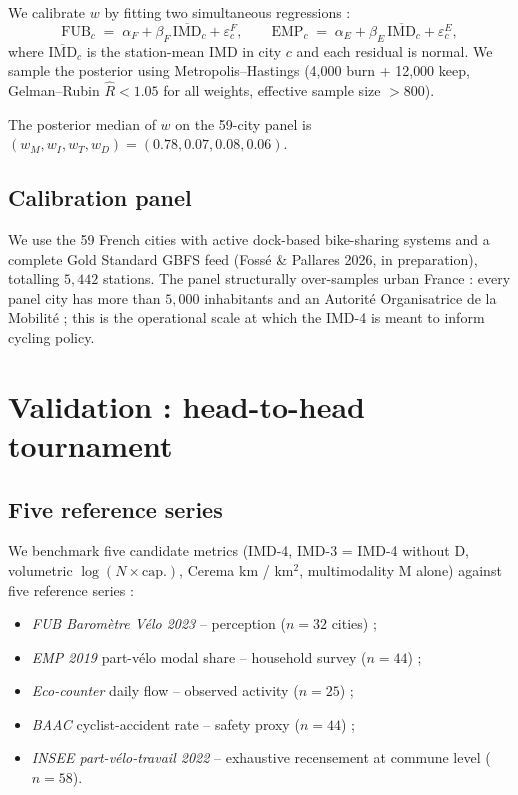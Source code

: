 \documentclass[11pt,a4paper]{article}
\newcommand{\IMD}{\mathrm{IMD}}
\begin{document}
We calibrate $w$ by fitting two simultaneous regressions :
\[
    \mathrm{FUB}_c \;=\; \alpha_F + \beta_F\, \overline{\IMD}_c + \varepsilon^{F}_{c}, \qquad
    \mathrm{EMP}_c \;=\; \alpha_E + \beta_E\, \overline{\IMD}_c + \varepsilon^{E}_{c},
\]
where $\overline{\IMD}_c$ is the station-mean IMD in city $c$ and
each residual is normal.  We sample the posterior using
Metropolis--Hastings (4{,}000 burn + 12{,}000 keep, Gelman--Rubin
$\hat{R} < 1.05$ for all weights, effective sample size $> 800$).

The posterior median of $w$ on the 59-city panel is
$(w_M, w_I, w_T, w_D) = (0.78, 0.07, 0.08, 0.06)$.

\subsection{Calibration panel}
\label{sec:calibration}

We use the 59 French cities with active dock-based bike-sharing
systems and a complete Gold Standard GBFS feed (Foss\'e
\& Pallares 2026, in preparation), totalling $5{,}442$ stations.
The panel structurally over-samples urban France : every panel city
has more than $5{,}000$ inhabitants and an Autorit\'e Organisatrice
de la Mobilit\'e ; this is the operational scale at which the IMD-4
is meant to inform cycling policy.

\section{Validation : head-to-head tournament}
\label{sec:tournament}

\subsection{Five reference series}

We benchmark five candidate metrics
(IMD-4, IMD-3 = IMD-4 without D, volumetric $\log(N \times \text{cap.})$,
Cerema km / km$^2$, multimodality M alone)
against five reference series :

\begin{itemize}[label=$\bullet$,leftmargin=*]
    \item \emph{FUB Barom\`etre V\'elo 2023} -- perception ($n=32$
          cities) ;
    \item \emph{EMP 2019} part-v\'elo modal share -- household
          survey ($n=44$) ;
    \item \emph{Eco-counter} daily flow -- observed activity ($n=25$) ;
    \item \emph{BAAC} cyclist-accident rate -- safety proxy ($n=44$) ;
    \item \emph{INSEE part-v\'elo-travail 2022} -- exhaustive
          recensement at commune level ($n=58$).
\end{itemize}
\end{document}
